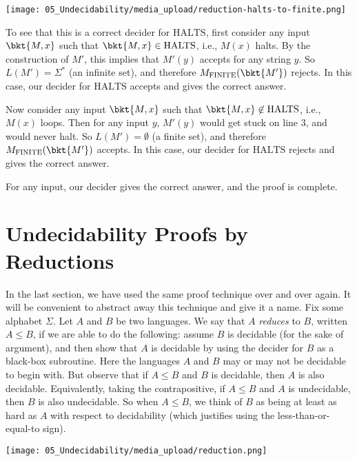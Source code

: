 \begin{flex}
\begin{solution}
\begin{center}
\texttt{[image: 05\_Undecidability/media\_upload/reduction-halts-to-finite.png]}
\end{center}

To see that this is a correct decider for $\text{HALTS}$, first consider any input $\bkt{M,x}$ such that $\bkt{M,x} \in \text{HALTS}$, i.e., $M(x)$ halts. By the construction of $M'$, this implies that $M'(y)$ accepts for any string $y$. So $L(M') = \Sigma^*$ (an infinite set), and therefore $M_\text{FINITE}(\bkt{M'})$ rejects. In this case, our decider for $\text{HALTS}$ accepts and gives the correct answer.

Now consider any input $\bkt{M,x}$ such that $\bkt{M,x} \not\in \text{HALTS}$, i.e., $M(x)$ loops. Then for any input $y$, $M'(y)$ would get stuck on line 3, and would never halt. So $L(M') = \emptyset$ (a finite set), and therefore $M_\text{FINITE}(\bkt{M'})$ accepts. In this case, our decider for $\text{HALTS}$ rejects and gives the correct answer.

For any input, our decider gives the correct answer, and the proof is complete.
\end{solution}
\end{flex}






\section{Undecidability Proofs by Reductions}


\begin{important} \label{important:Undecidability-proofs-by-reduction}
In the last section, we have used the same proof technique over and over again. It will be convenient to abstract away this technique and give it a name. Fix some alphabet $\Sigma$. Let $A$ and $B$ be two languages. We say that $A$ \emph{reduces} to $B$, written $A \leq B$, if we are able to do the following: assume $B$ is decidable (for the sake of argument), and then show that $A$ is decidable by using the decider for $B$ as a black-box subroutine. Here the languages $A$ and $B$ may or may not be decidable to begin with. But observe that if $A \leq B$ and $B$ is decidable, then $A$ is also decidable. Equivalently, taking the contrapositive, if $A \leq B$ and $A$ is undecidable, then $B$ is also undecidable. So when $A \leq B$, we think of $B$ as being at least as hard as $A$ with respect to decidability (which justifies using the less-than-or-equal-to sign).
\begin{center}
\texttt{[image: 05\_Undecidability/media\_upload/reduction.png]}
\end{center}
\end{important}


